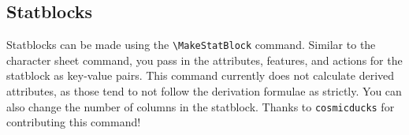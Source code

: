 \documentclass[article,stormlight,timeline,statblock]{plotweaver}
\begin{document}
\subsection{Statblocks}
Statblocks can be made using the \texttt{\textbackslash MakeStatBlock} command. Similar to the character sheet command, you pass in the attributes, features, and actions for the statblock as key-value pairs. This command currently does not calculate derived attributes, as those tend to not follow the derivation formulae as strictly. You can also change the number of columns in the statblock. Thanks to \texttt{cosmicducks} for contributing this command!

\end{document}

